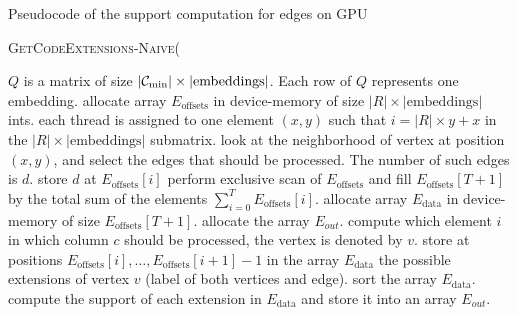 \begin{algorithm}[!htb]
\caption{Pseudocode of the support computation for edges on GPU}
\vbox{\textsc{GetCodeExtensions-Naive}(}
\begin{algorithmic}[1]
  \REQUIRE $Q$ is a matrix of size $|\mindfscode|\times|\text{embeddings}|$. Each row of $Q$ represents one embedding.
  \STATE allocate array $E_{\text{offsets}}$ in device-memory of size $|R|\times |\text{embeddings}|$ ints.
       \STATE each thread is assigned to one element $(x,y)$ such that
              $i = |R|\times y + x$ in the $|R|\times |\text{embeddings}|$
              submatrix.
       \STATE look at the neighborhood of vertex at position $(x,y)$, and select the edges that should be processed. The number of such edges is $d$.
       \STATE store $d$ at $E_{\text{offsets}}[i]$
       \STATE perform exclusive scan of $E_{\text{offsets}}$ and fill
              $E_{\text{offsets}}[T+1]$ by the total sum of the elements
              $\sum^{T}_{i=0} E_{\text{offsets}}[i]$.
  \ENDFOR
  \STATE allocate array $E_{\text{data}}$ in device-memory of size $E_{\text{offsets}}[T+1]$.
  \STATE allocate the array $E_{out}$.
     \STATE compute which element $i$ in which column $c$ should be processed, the vertex is denoted by $v$.
     \STATE store at positions $E_{\text{offsets}}[i], \ldots,
            E_{\text{offsets}}[i+1]-1$ in the array $E_{\text{data}}$ the
            possible extensions of vertex $v$ (label of both vertices and
            edge).
     \STATE sort the array $E_{\text{data}}$.
     \STATE compute the support of each extension in $E_{\text{data}}$ and store it into an array $E_{out}$.
  \ENDFOR
\end{algorithmic}
\end{algorithm}


\fi



